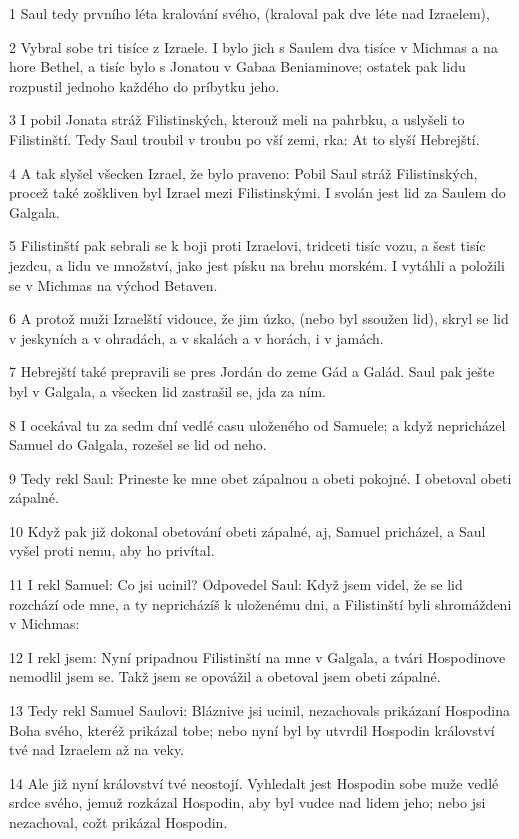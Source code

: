 \par 1 Saul tedy prvního léta kralování svého, (kraloval pak dve léte nad Izraelem),
\par 2 Vybral sobe tri tisíce z Izraele. I bylo jich s Saulem dva tisíce v Michmas a na hore Bethel, a tisíc bylo s Jonatou v Gabaa Beniaminove; ostatek pak lidu rozpustil jednoho každého do príbytku jeho.
\par 3 I pobil Jonata stráž Filistinských, kterouž meli na pahrbku, a uslyšeli to Filistinští. Tedy Saul troubil v troubu po vší zemi, rka: At to slyší Hebrejští.
\par 4 A tak slyšel všecken Izrael, že bylo praveno: Pobil Saul stráž Filistinských, procež také zoškliven byl Izrael mezi Filistinskými. I svolán jest lid za Saulem do Galgala.
\par 5 Filistinští pak sebrali se k boji proti Izraelovi, tridceti tisíc vozu, a šest tisíc jezdcu, a lidu ve množství, jako jest písku na brehu morském. I vytáhli a položili se v Michmas na východ Betaven.
\par 6 A protož muži Izraelští vidouce, že jim úzko, (nebo byl ssoužen lid), skryl se lid v jeskyních a v ohradách, a v skalách a v horách, i v jamách.
\par 7 Hebrejští také prepravili se pres Jordán do zeme Gád a Galád. Saul pak ješte byl v Galgala, a všecken lid zastrašil se, jda za ním.
\par 8 I ocekával tu za sedm dní vedlé casu uloženého od Samuele; a když nepricházel Samuel do Galgala, rozešel se lid od neho.
\par 9 Tedy rekl Saul: Prineste ke mne obet zápalnou a obeti pokojné. I obetoval obeti zápalné.
\par 10 Když pak již dokonal obetování obeti zápalné, aj, Samuel pricházel, a Saul vyšel proti nemu, aby ho privítal.
\par 11 I rekl Samuel: Co jsi ucinil? Odpovedel Saul: Když jsem videl, že se lid rozchází ode mne, a ty nepricházíš k uloženému dni, a Filistinští byli shromáždeni v Michmas:
\par 12 I rekl jsem: Nyní pripadnou Filistinští na mne v Galgala, a tvári Hospodinove nemodlil jsem se. Takž jsem se opovážil a obetoval jsem obeti zápalné.
\par 13 Tedy rekl Samuel Saulovi: Bláznive jsi ucinil, nezachovals prikázaní Hospodina Boha svého, kteréž prikázal tobe; nebo nyní byl by utvrdil Hospodin království tvé nad Izraelem až na veky.
\par 14 Ale již nyní království tvé neostojí. Vyhledalt jest Hospodin sobe muže vedlé srdce svého, jemuž rozkázal Hospodin, aby byl vudce nad lidem jeho; nebo jsi nezachoval, cožt prikázal Hospodin.
